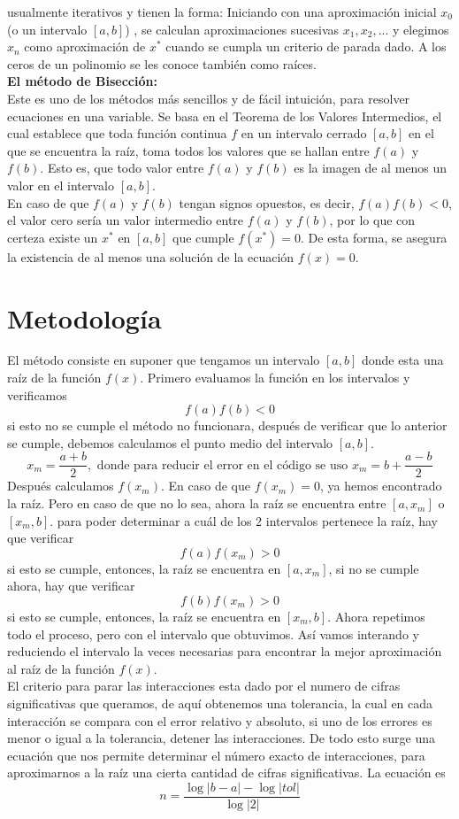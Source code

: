\documentclass[12pt]{article}
\providecommand{\abs}[1]{\lvert#1\rvert}
\begin{document}
			usualmente iterativos y tienen la forma: Iniciando con una aproximación inicial $ x_0 $ (o un intervalo $ [a,b] $) , 
			se calculan aproximaciones sucesivas $ x_1,x_2,... $ y elegimos $ x_n $ como aproximación de $ x^* $ cuando se cumpla un 
			criterio de parada dado. A los ceros de un polinomio se les conoce también como raíces. \cite{bib:item3} \\
			\textbf{El método de Bisección:}\\	
			Este es uno de los métodos más sencillos y de fácil intuición, para resolver ecuaciones en una 
			variable. Se basa en el Teorema de los Valores Intermedios, el cual establece que toda función 
			continua $ f $ en un intervalo cerrado $ [a,b] $ en el que se encuentra la raíz, toma todos los valores que se 
			hallan entre $ f(a) $ y $ f(b) $. Esto es, que todo valor entre $f(a) $ y $ f(b) $ es la imagen de al menos un valor 
			en el intervalo $ [a,b] $.\\
			En caso de que $ f(a) $ y $ f(b) $ tengan signos opuestos, es decir, $ f(a)f(b) < 0 $, el valor cero sería un 
			valor intermedio entre $ f(a) $ y $ f(b) $, por lo que con certeza existe un $ x^* $ en $ [a,b] $ que cumple $f(x^*) = 0 $. 
			De esta forma, se asegura la existencia de al menos una solución de la ecuación $ f(x) = 0 $. \cite{bib:item2}
		\section*{\centering Metodología}\label{sec:Metodologia}
			El método consiste en suponer que tengamos un intervalo $ [a,b] $ donde esta una raíz de la función $ f(x) $. 
			Primero evaluamos la función en los intervalos y verificamos $$ f(a)f(b) < 0 $$ si esto no se 
			cumple el método no funcionara, después de verificar que lo anterior se cumple, debemos calculamos el punto 
			medio del intervalo $ [a,b] $. $$ x_m = \frac{a+b}{2},\text{ donde para reducir el error en el código se uso } x_m = b+\frac{a-b}{2} $$
			Después calculamos $ f(x_m) $. En caso de que $ f(x_m) = 0 $, ya hemos encontrado la raíz. Pero en 
			caso de que no lo sea, ahora la raíz se encuentra entre $ [a,x_m] $ o $ [x_m,b] $. para poder determinar 
			a cuál de los 2 intervalos pertenece la raíz, hay que verificar $$ f(a)f(x_m) > 0 $$ si esto se 
			cumple, entonces, la raíz se encuentra en $ [a,x_m] $, si no se cumple ahora, hay que verificar $$ f(b)f(x_m) > 0 $$ si esto se cumple, 
			entonces, la raíz se encuentra en $ [x_m,b] $. Ahora repetimos todo el proceso, pero con el intervalo 
			que obtuvimos. Así vamos interando y reduciendo el intervalo la veces necesarias para encontrar la mejor 
			aproximación al raíz de la función $ f(x) $.\\
			El criterio para parar las interacciones esta dado por el numero de cifras significativas que queramos, 
			de aquí obtenemos una tolerancia, la cual en cada interacción se compara con el error relativo y 
			absoluto, si uno de los errores es menor o igual a la tolerancia, detener las interacciones. De todo 
			esto surge una ecuación que nos permite determinar el número exacto de interacciones, para 
			aproximarnos a la raíz una cierta cantidad de cifras significativas. La ecuación es $$ n = \frac{\log{\abs{b-a}}-\log{\abs{tol}}}{\log{\abs{2}}} $$
\end{document}
